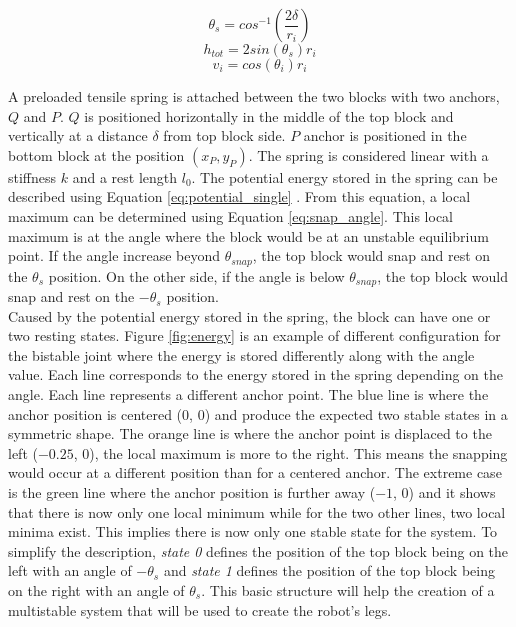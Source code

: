     \begin{equation}
        \theta_s = cos^{-1}\left(\frac{2\delta}{r_i}\right)
        \label{eq:theta_s}
    \end{equation}
    \begin{equation}
        h_{tot} = 2 sin(\theta_s) r_i
        \label{eq:max_dist}
    \end{equation}
    \begin{equation}
        v_i = cos(\theta_i) r_i
        \label{eq:y_block}
    \end{equation}
    
    A preloaded tensile spring is attached between the two blocks with two anchors, $Q$ and $P$. $Q$ is positioned horizontally in the middle of the top block and vertically at a distance $\delta$ from top block side. $P$ anchor is positioned in the bottom block at the position $(x_P, y_P)$.
    The spring is considered linear with a stiffness $k$ and a rest length $l_0$. The potential energy stored in the spring can be described using Equation \ref{eq:potential_single} \cite{mo_main_paper}. From this equation, a local maximum can be determined using Equation \ref{eq:snap_angle}. This local maximum is at the angle where the block would be at an unstable equilibrium point. If the angle increase beyond $\theta_{snap}$, the top block would snap and rest on the $\theta_s$ position. On the other side, if the angle is below $\theta_{snap}$, the top block would snap and rest on the $-\theta_s$ position.\\
    
   Caused by the potential energy stored in the spring, the block can have one or two resting states. Figure \ref{fig:energy} is an example of different configuration for the bistable joint where the energy is stored differently along with the angle value. Each line corresponds to the energy stored in the spring depending on the angle. Each line represents a different anchor point. The blue line is where the anchor position is centered ($0$, $0$) and produce the expected two stable states in a symmetric shape. The orange line is where the anchor point is displaced to the left ($-0.25$, $0$), the local maximum is more to the right. This means the snapping would occur at a different position than for a centered anchor. The extreme case is the green line where the anchor position is further away ($-1$, $0$) and it shows that there is now only one local minimum while for the two other lines, two local minima exist. This implies there is now only one stable state for the system. To simplify the description, \textit{state 0} defines the position of the top block being on the left with an angle of $-\theta_s$ and \textit{state 1}  defines the position of the top block being on the right with an angle of $\theta_s$. This basic structure will help the creation of a multistable system that will be used to create the robot's legs. 
    

